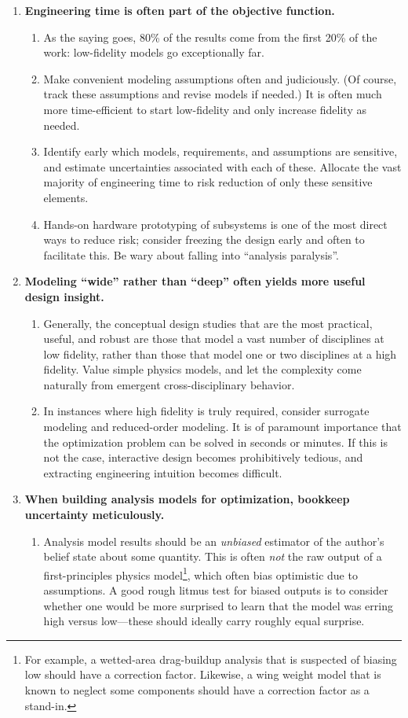 \begin{enumerate}
    \item \textbf{Engineering time is often part of the objective function.}
    \begin{enumerate}
        \item As the saying goes, 80\% of the results come from the first 20\% of the work: low-fidelity models go exceptionally far.
        \item Make convenient modeling assumptions often and judiciously. (Of course, track these assumptions and revise models if needed.) It is often much more time-efficient to start low-fidelity and only increase fidelity as needed.
        \item Identify early which models, requirements, and assumptions are sensitive, and estimate uncertainties associated with each of these. Allocate the vast majority of engineering time to risk reduction of only these sensitive elements.
        \item Hands-on hardware prototyping of subsystems is one of the most direct ways to reduce risk; consider freezing the design early and often to facilitate this. Be wary about falling into ``analysis paralysis''.
    \end{enumerate}
    \item \textbf{Modeling ``wide'' rather than ``deep'' often yields more useful design insight.}
    \begin{enumerate}
        \item Generally, the conceptual design studies that are the most practical, useful, and robust are those that model a vast number of disciplines at low fidelity, rather than those that model one or two disciplines at a high fidelity. Value simple physics models, and let the complexity come naturally from emergent cross-disciplinary behavior.
        \item In instances where high fidelity is truly required, consider surrogate modeling and reduced-order modeling. It is of paramount importance that the optimization problem can be solved in seconds or minutes. If this is not the case, interactive design becomes prohibitively tedious, and extracting engineering intuition becomes difficult.
    \end{enumerate}
    \item \textbf{When building analysis models for optimization, bookkeep uncertainty meticulously.}
    \begin{enumerate}
        \item Analysis model results should be an \emph{unbiased} estimator of the author's belief state about some quantity. This is often \emph{not} the raw output of a first-principles physics model\footnote{For example, a wetted-area drag-buildup analysis that is suspected of biasing low should have a correction factor. Likewise, a wing weight model that is known to neglect some components should have a correction factor as a stand-in.}, which often bias optimistic due to assumptions. A good rough litmus test for biased outputs is to consider whether one would be more surprised to learn that the model was erring high versus low—these should ideally carry roughly equal surprise.

\end{enumerate}
\end{enumerate}

